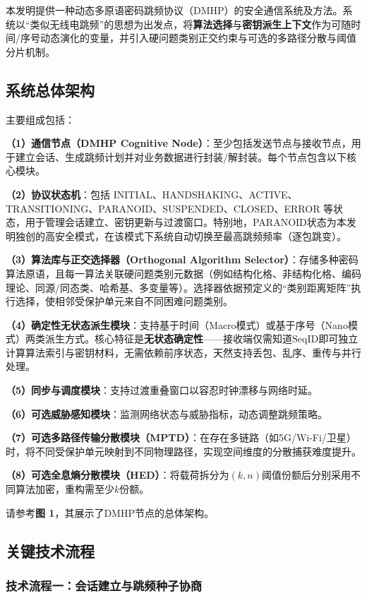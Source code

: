 \documentclass[12pt,a4paper]{article}
\begin{document}
本发明提供一种动态多原语密码跳频协议（DMHP）的安全通信系统及方法。系统以``类似无线电跳频''的思想为出发点，将\textbf{算法选择}与\textbf{密钥派生上下文}作为可随时间/序号动态演化的变量，并引入硬问题类别正交约束与可选的多路径分散与阈值分片机制。

\subsection{系统总体架构}

主要组成包括：

\textbf{（1）通信节点（DMHP Cognitive Node）}：至少包括发送节点与接收节点，用于建立会话、生成跳频计划并对业务数据进行封装/解封装。每个节点包含以下核心模块。

\textbf{（2）协议状态机}：包括 INITIAL、HANDSHAKING、ACTIVE、TRANSITIONING、PARANOID、SUSPENDED、CLOSED、ERROR 等状态，用于管理会话建立、密钥更新与过渡窗口。特别地，PARANOID状态为本发明独创的高安全模式，在该模式下系统自动切换至最高跳频频率（逐包跳变）。

\textbf{（3）算法库与正交选择器（Orthogonal Algorithm Selector）}：存储多种密码算法原语，且每一算法关联硬问题类别元数据（例如结构化格、非结构化格、编码理论、同源/同态类、哈希基、多变量等）。选择器依据预定义的``类别距离矩阵''执行选择，使相邻受保护单元来自不同困难问题类别。

\textbf{（4）确定性无状态派生模块}：支持基于时间（Macro模式）或基于序号（Nano模式）两类派生方式。核心特征是\textbf{无状态确定性}——接收端仅需知道$\text{SeqID}$即可独立计算算法索引与密钥材料，无需依赖前序状态，天然支持丢包、乱序、重传与并行处理。

\textbf{（5）同步与调度模块}：支持过渡重叠窗口以容忍时钟漂移与网络时延。

\textbf{（6）可选威胁感知模块}：监测网络状态与威胁指标，动态调整跳频策略。

\textbf{（7）可选多路径传输分散模块（MPTD）}：在存在多链路（如5G/Wi-Fi/卫星）时，将不同受保护单元映射到不同物理路径，实现空间维度的分散捕获难度提升。

\textbf{（8）可选全息熵分散模块（HED）}：将载荷拆分为$(k,n)$阈值份额后分别采用不同算法加密，重构需至少$k$份额。

请参考\textbf{图 1}，其展示了DMHP节点的总体架构。

\subsection{关键技术流程}

\subsubsection{技术流程一：会话建立与跳频种子协商}
\end{document}
